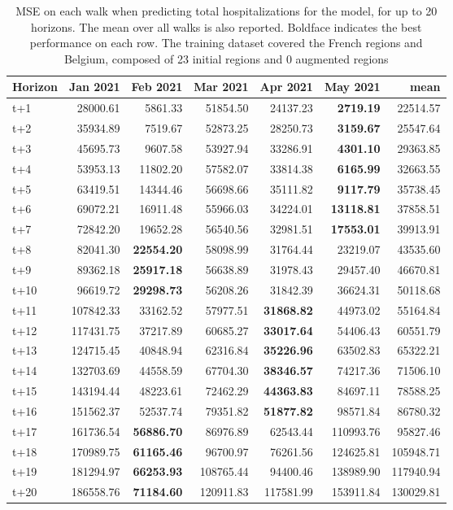 \begin{table}[H]
\centering
\caption{MSE on each walk when predicting total hospitalizations for the model, for up to 20 horizons. The mean over all walks is also reported. Boldface indicates the best performance on each row. The training dataset covered the French regions and Belgium, composed of 23 initial regions and 0 augmented regions }
\label{tab:MSE_walk_assembly}
\begin{tabular}{lrrrrrr}
\toprule
Horizon &  Jan 2021 &  Feb 2021 &  Mar 2021 &  Apr 2021 &  May 2021 &      mean \\
\midrule
t+1  & 28000.61  & 5861.33  & 51854.50  & 24137.23  & \textbf{2719.19}  & 22514.57  \\
t+2  & 35934.89  & 7519.67  & 52873.25  & 28250.73  & \textbf{3159.67}  & 25547.64  \\
t+3  & 45695.73  & 9607.58  & 53927.94  & 33286.91  & \textbf{4301.10}  & 29363.85  \\
t+4  & 53953.13  & 11802.20  & 57582.07  & 33814.38  & \textbf{6165.99}  & 32663.55  \\
t+5  & 63419.51  & 14344.46  & 56698.66  & 35111.82  & \textbf{9117.79}  & 35738.45  \\
t+6  & 69072.21  & 16911.48  & 55966.03  & 34224.01  & \textbf{13118.81}  & 37858.51  \\
t+7  & 72842.20  & 19652.28  & 56540.56  & 32981.51  & \textbf{17553.01}  & 39913.91  \\
t+8  & 82041.30  & \textbf{22554.20}  & 58098.99  & 31764.44  & 23219.07  & 43535.60  \\
t+9  & 89362.18  & \textbf{25917.18}  & 56638.89  & 31978.43  & 29457.40  & 46670.81  \\
t+10  & 96619.72  & \textbf{29298.73}  & 56208.26  & 31842.39  & 36624.31  & 50118.68  \\
t+11  & 107842.33  & 33162.52  & 57977.51  & \textbf{31868.82}  & 44973.02  & 55164.84  \\
t+12  & 117431.75  & 37217.89  & 60685.27  & \textbf{33017.64}  & 54406.43  & 60551.79  \\
t+13  & 124715.45  & 40848.94  & 62316.84  & \textbf{35226.96}  & 63502.83  & 65322.21  \\
t+14  & 132703.69  & 44558.59  & 67704.30  & \textbf{38346.57}  & 74217.36  & 71506.10  \\
t+15  & 143194.44  & 48223.61  & 72462.29  & \textbf{44363.83}  & 84697.11  & 78588.25  \\
t+16  & 151562.37  & 52537.74  & 79351.82  & \textbf{51877.82}  & 98571.84  & 86780.32  \\
t+17  & 161736.54  & \textbf{56886.70}  & 86976.89  & 62543.44  & 110993.76  & 95827.46  \\
t+18  & 170989.75  & \textbf{61165.46}  & 96700.97  & 76261.56  & 124625.81  & 105948.71  \\
t+19  & 181294.97  & \textbf{66253.93}  & 108765.44  & 94400.46  & 138989.90  & 117940.94  \\
t+20  & 186558.76  & \textbf{71184.60}  & 120911.83  & 117581.99  & 153911.84  & 130029.81  \\

\bottomrule
\end{tabular}
\end{table}
